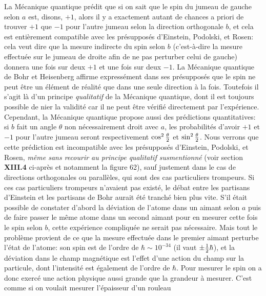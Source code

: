 \medskip
La M\'ecanique quantique pr\'edit que si on sait que le spin
du jumeau de gauche selon $a$ est, disons, $+1$, alors il y a
exactement autant de chances a priori de trouver $+1$ que
$-1$ pour l'autre jumeau selon la direction orthogonale $b$, 
et cela est enti\`erement compatible avec les pr\'esuppos\'es
d'Einstein,  Podolski,  et Rosen:  cela veut dire que la mesure
indirecte du spin selon $b$ (c'est-\`a-dire la mesure effectu\'ee
sur le jumeau de droite afin de ne pas perturber celui de gauche)
donnera une fois sur deux $+1$ et une fois sur deux $-1$. 
\medskip
La M\'ecanique quantique de Bohr et Heisenberg affirme express\'ement
dans ses pr\'esuppos\'es que le spin ne peut \^etre un \'el\'ement de
r\'ealit\'e que dans une seule direction \`a la fois.  Toutefois
il s'agit l\`a d'un principe {\it qualitatif} de la M\'ecanique
quantique,  dont il est toujours possible de nier la validit\'e
car il ne peut \^etre v\'erifi\'e directement par l'exp\'erience. 
Cependant,  la M\'ecanique quantique propose aussi des pr\'edictions
quantitatives:  si $b$ fait un angle $\theta$ non n\'ecessairement
droit avec $a$,  les probabilit\'es  d'avoir $+1$ et $-1$ pour
l'autre jumeau seront respectivement $\cos^2{\theta \over 2}$ et
$\sin^2{\theta \over 2}$.  Nous verrons que cette pr\'ediction est
incompatible avec les pr\'esuppos\'es d'Einstein,  Podolski, 
et Rosen,  {\it m\^eme sans recourir au principe qualitatif
susmentionn\'e} (voir section {\bf XIII.4} ci-apr\`es et notamment la
figure 62),  sauf justement dans le cas de directions orthogonales
ou parall\`eles,  qui sont des cas particuliers trompeurs.  Si ces
cas particuliers trompeurs n'avaient pas exist\'e,  le d\'ebat entre
les {\og partisans d'Einstein\fg} et les {\og partisans de Bohr\fg}
aurait \'et\'e tranch\'e bien plus vite. 
\medskip 
S'il \'etait possible de constater d'abord la d\'eviation de l'atome dans  
un aimant selon $a$ puis de faire passer le m\^eme atome dans un second 
aimant pour en mesurer cette fois le spin selon $b$, cette 
exp\'erience compliqu\'ee ne serait pas n\'ecessaire. Mais tout le  
probl\`eme  provient de ce que la mesure effectu\'ee dans le premier 
aimant perturbe l'\'etat de l'atome: son spin est de l'ordre de $\hbar  
\sim 10^{-34}$ (il vaut $\pm {1\over 2}\hbar$), et la d\'eviation dans le 
champ magn\'etique est l'effet d'une action du champ sur la particule, 
dont l'intensit\'e est \'egalement de l'ordre de $\hbar$. Pour mesurer le 
spin on a donc exerc\'e une action physique aussi grande que la grandeur 
\`a mesurer. C'est comme si on voulait mesurer l'\'epaisseur d'un rouleau 
